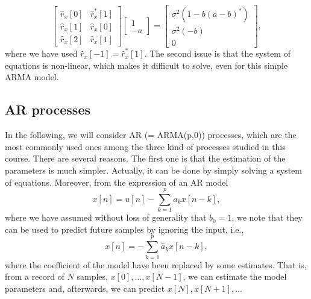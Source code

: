 \begin{example}
\begin{equation*}
	\begin{bmatrix}
	\hat{r}_x[0] & \hat{r}_x^{\ast}[1] \\
	\hat{r}_x[1] & \hat{r}_x[0] \\
	\hat{r}_x[2] & \hat{r}_x[1] 
\end{bmatrix}
\begin{bmatrix}
	1 \\ -a
\end{bmatrix} = 
\begin{bmatrix}
	\sigma^2 \left(1 - b (a-b)^{\ast}\right) \\
	\sigma^2  (-b) \\
	0
\end{bmatrix},
\end{equation*}
where we have used $\hat{r}_x[-1] = \hat{r}_x^{\ast}[1]$. The second issue is that the system of equations is non-linear, which makes it difficult to solve, even for this simple ARMA model.
\end{example}

\subsection{AR processes}

In the following, we will consider AR (= ARMA(p,0)) processes, which are the most commonly used ones among the three kind of processes studied in this course. There are several reasons. The first one is that the estimation of the parameters is much simpler. Actually, it can be done by simply solving a system of equations. Moreover, from the expression of an AR model
\begin{equation*}
x[n]  = u[n] - \sum_{k = 1}^{p} a_k x[n -k],
\end{equation*}
where we have assumed without loss of generality that $b_0 = 1$, we note that they can be used to predict future samples by ignoring the input, i.e.,
\begin{equation*}
x[n]  =  - \sum_{k = 1}^{p} \hat{a}_k x[n -k],
\end{equation*}
where the coefficient of the model have been replaced by some estimates. That is, from a record of $N$ samples, $x[0], \ldots, x[N-1]$, we can estimate the model parameters and, afterwards, we can predict $x[N], x[N+1], \ldots$

